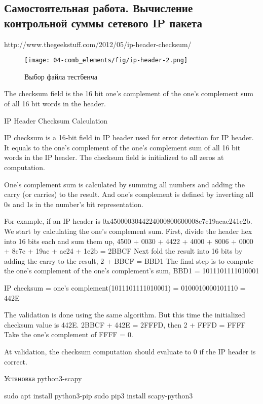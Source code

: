 \subsection{Самостоятельная работа. Вычисление контрольной суммы сетевого IP пакета}

http://www.thegeekstuff.com/2012/05/ip-header-checksum/

\begin{figure}
\centering
\texttt{[image: 04-comb\_elements/fig/ip-header-2.png]}
\caption{Выбор файла тестбенча}
\label{add_sim_src_2}
\end{figure}


The checksum field is the 16 bit one's complement of the one's complement sum of all 16 bit words in the header. 

IP Header Checksum Calculation

IP checksum is a 16-bit field in IP header used for error detection for IP header. It equals to the one’s complement of the one’s complement sum of all 16 bit words in the IP header. The checksum field is initialized to all zeros at computation.

One’s complement sum is calculated by summing all numbers and adding the carry (or carries) to the result. And one’s complement is defined by inverting all 0s and 1s in the number’s bit representation.

For example, if an IP header is 0x4500003044224000800600008c7c19acae241e2b. 
We start by calculating the one’s complement sum. First, divide the header hex into 16 bits each and sum them up,
4500 + 0030 + 4422 + 4000 + 8006 + 0000 + 8c7c + 19ac + ae24 + 1e2b = 2BBCF
Next fold the result into 16 bits by adding the carry to the result,
2 +  BBCF  = BBD1
The final step is to compute the one’s complement of the one’s complement’s sum,
BBD1 = 1011101111010001

IP checksum = one’s complement(1011101111010001) = 0100010000101110 = 442E


The validation is done using the same algorithm. But this time the initialized checksum value is 442E.
2BBCF + 442E = 2FFFD, then 2 + FFFD = FFFF
Take the one’s complement of FFFF = 0.

At validation, the checksum computation should evaluate to 0 if the IP header is correct.


Установка python3-scapy

sudo apt install python3-pip
sudo pip3 install scapy-python3